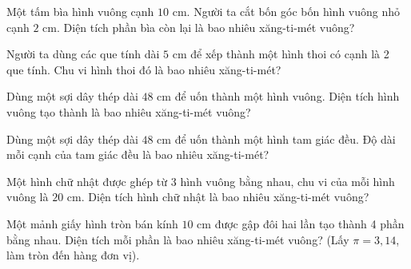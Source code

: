 \begin{ex}
  Một tấm bìa hình vuông cạnh $10\text{ cm}$. Người ta cắt bốn góc bốn hình vuông nhỏ cạnh $2\text{ cm}$. Diện tích phần bìa còn lại là bao nhiêu xăng-ti-mét vuông?
\end{ex}

\begin{ex}
  Người ta dùng các que tính dài $5\text{ cm}$ để xếp thành một hình thoi có cạnh là 2 que tính. Chu vi hình thoi đó là bao nhiêu xăng-ti-mét?
\end{ex}

\begin{ex}
  Dùng một sợi dây thép dài $48\text{ cm}$ để uốn thành một hình vuông. Diện tích hình vuông tạo thành là bao nhiêu xăng-ti-mét vuông?
\end{ex}

\begin{ex}
  Dùng một sợi dây thép dài $48\text{ cm}$ để uốn thành một hình tam giác đều. Độ dài mỗi cạnh của tam giác đều là bao nhiêu xăng-ti-mét?
\end{ex}

\begin{ex}
  Một hình chữ nhật được ghép từ 3 hình vuông bằng nhau, chu vi của mỗi hình vuông là $20\text{ cm}$. Diện tích hình chữ nhật là bao nhiêu xăng-ti-mét vuông?
\end{ex}

\begin{ex}
  Một mảnh giấy hình tròn bán kính $10\text{ cm}$ được gập đôi hai lần tạo thành 4 phần bằng nhau. Diện tích mỗi phần là bao nhiêu xăng-ti-mét vuông? (Lấy $\pi = 3{,}14$, làm tròn đến hàng đơn vị).
\end{ex}

